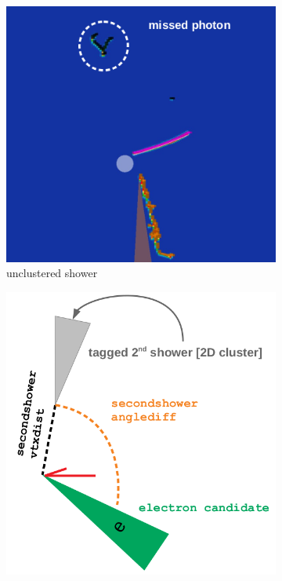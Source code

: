 \begin{figure}[H] 
\begin{center}
    \begin{subfigure}[b]{0.35\textwidth}
    \centering
    \includegraphics[width=1.00\textwidth]{nueselection/variables/secondshowerevd.png}
    \caption{\label{fig:nue:variables:secondshowerevd} unclustered shower }
    \end{subfigure}
    \begin{subfigure}[b]{0.35\textwidth}
    \centering
    \includegraphics[width=1.00\textwidth]{nueselection/variables/secondshower.png}

\end{subfigure}
\end{center}
\end{figure}

